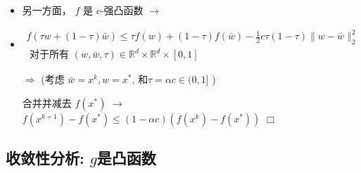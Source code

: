 \documentclass[handout]{beamer}
\begin{document}
\begin{frame}
	\begin{itemize}
  \item[] 

另一方面，  $f$ 是 $c$-强凸函数 $\rightarrow$
\item  
\begin{equation}
\begin{array}{c}
f(\tau w+(1-\tau) \bar{w}) \leq \tau f(w)+(1-\tau) f(\bar{w})-\frac{1}{2} c \tau(1-\tau)\|w-\bar{w}\|_{2}^{2} \\
\text { 对于所有 }(w, \bar{w}, \tau) \in \mathbb{R}^{d} \times \mathbb{R}^{d} \times[0,1]
\end{array}
\end{equation}


$\Rightarrow$ (考虑 $\bar{w}=x^{k}, w=x^{*}$, 和$\tau=\alpha c \in(0,1]$ )
  
合并并减去 $f\left(x^{*}\right)$ $\rightarrow$ 
$
f\left(x^{k+1}\right)-f\left(x^{*}\right) \leq(1-\alpha c)\left(f\left(x^{k}\right)-f\left(x^{*}\right)\right)
$
\mbox{} \hfill{} $\Box$
\end{itemize}


\end{frame}


\subsection{收敛性分析: $g$是凸函数}
\end{document}
